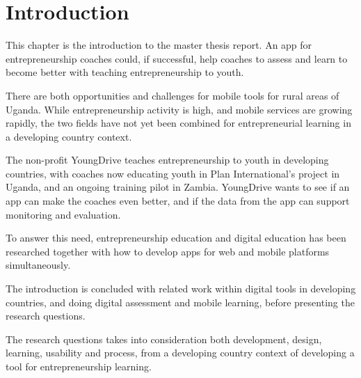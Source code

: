 \chapter{Introduction}\label{cha:intro}



This chapter is the introduction to the master thesis report. An app for entrepreneurship coaches could, if successful, help coaches to assess and learn to become better with teaching entrepreneurship to youth.

There are both opportunities and challenges for mobile tools for rural areas of Uganda. While entrepreneurship activity is high, and mobile services are growing rapidly, the two fields have not yet been combined for entrepreneurial learning in a developing country context.

The non-profit YoungDrive teaches entrepreneurship to youth in developing countries, with coaches now educating youth in Plan International's project in Uganda, and an ongoing training pilot in Zambia. YoungDrive wants to see if an app can make the coaches even better, and if the data from the app can support monitoring and evaluation.

To answer this need, entrepreneurship education and digital education has been researched together with how to develop apps for web and mobile platforms simultaneously.

The introduction is concluded with related work within digital tools in developing countries, and doing digital assessment and mobile learning, before presenting the research questions.

The research questions takes into consideration both development, design, learning, usability and process, from a developing country context of developing a tool for entrepreneurship learning.



% 

%





%

%

%

